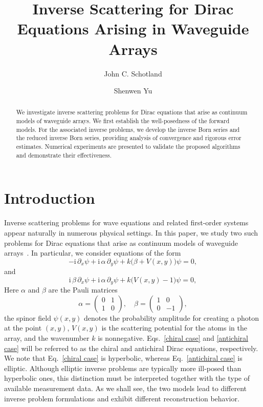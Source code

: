 \documentclass[12pt,reqno]{amsart}
\begin{document}
\title{Inverse Scattering for Dirac Equations Arising in Waveguide Arrays}
\author{John C. Schotland}
\address{Department of Mathematics and Department of Physics, Yale University, New Haven, CT, USA}
\author{Shenwen Yu}
\address{Department of Mathematical Sciences, Tsinghua University, Beijing,  China}
\begin{abstract}
 We investigate inverse scattering problems for  Dirac equations that arise as continuum models of waveguide arrays. We first establish the well-posedness of the forward models. For the associated inverse problems, we develop the inverse Born series  and the reduced inverse Born series, providing analysis of convergence and rigorous error estimates. Numerical experiments are presented to validate the proposed algorithms and demonstrate their effectiveness.
\end{abstract}
\maketitle

\section{Introduction}
Inverse scattering problems for wave equations and related first-order systems appear naturally in numerous physical settings. In this paper, we study two such problems for Dirac equations that arise as continuum models of waveguide arrays~\cite{quantum2023}. In particular, we consider equations of the form
\begin{equation}\label{chiral case}
    -\mathrm{i}\,\partial_x \psi + \mathrm{i}\,\alpha\,\partial_y \psi + k\bigl(\beta + V(x,y)\bigr)\psi = 0,
\end{equation}
and
\begin{equation}\label{antichiral case}
    \mathrm{i}\,\beta\,\partial_x \psi + \mathrm{i}\,\alpha\,\partial_y \psi + k\bigl(V(x,y)-1\bigr)\psi = 0,
\end{equation}
Here $\alpha$ and $\beta$ are the Pauli matrices
\[
    \alpha=\begin{pmatrix}0&1\\[0.2em]1&0\end{pmatrix},
    \quad
    \beta=\begin{pmatrix}1&0\\[0.2em]0&-1\end{pmatrix},
\]
the spinor field $\psi(x,y)$ denotes the probability amplitude for creating a photon at the point $(x,y)$, $V(x,y)$ is the scattering potential for the atoms in the array, and the wavenumber $k$ is nonnegative. Eqs.~\eqref{chiral case} and \eqref{antichiral case} will be referred to as the chiral and antichiral Dirac equations, respectively. We note that Eq.~\eqref{chiral case} is hyperbolic, whereas Eq.~\eqref{antichiral case}
is elliptic. Although elliptic inverse problems are typically more ill-posed than
hyperbolic ones, this distinction must be interpreted together with the type of available
measurement data. As we shall see, the two models lead to different inverse problem
formulations and exhibit different reconstruction behavior.
\end{document}

